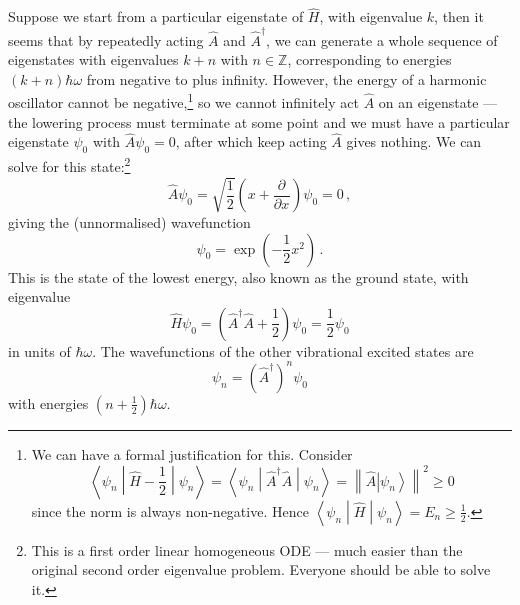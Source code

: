 \documentclass{article}
\theoremstyle{plain}\theoremheaderfont{\normalfont\itshape}\theorembodyfont{\rmfamily}\theoremseparator{.}\newtheorem*{rem}{Remark}\newtheorem*{ex}{Example}\newtheorem*{proof}{Proof}\newtheorem*{altp}{Alternative proof}
\theoremstyle{plain}\theoremheaderfont{\normalfont\bfseries}\theorembodyfont{\rmfamily}\theoremseparator{.}\newtheorem{thm}{Theorem}[section]\newtheorem{lem}[thm]{Lemma}\newtheorem{prop}[thm]{Proposition}\newtheorem*{cor}{Corollary}\newtheorem{defn}[thm]{Definition}\newtheorem{clm}[thm]{Claim}\newtheorem{clminproof}{Claim}\newtheorem*{law}{Law}\newtheorem{pos}[thm]{Postulate}
\theoremstyle{break}\theoremheaderfont{\normalfont\itshape}\theorembodyfont{\rmfamily}\theoremseparator{.\medskip}\newtheorem*{proofskip}{Proof}\newtheorem*{exs}{Examples}\newtheorem*{rems}{Remarks}
\theoremstyle{break}\theoremheaderfont{\normalfont\bfseries}\theorembodyfont{\rmfamily}\theoremseparator{.\medskip}\newtheorem{lemskip}[thm]{Lemma}\newtheorem{defnskip}[thm]{Definition}\newtheorem{propskip}[thm]{Proposition}\newtheorem{thmskip}[thm]{Theorem}
\numberwithin{equation}{section}
\newcommand{\pdv}[3][]{\frac{\partial^{#1} #2}{{\partial #3}^{#1}}}
\newcommand{\ket}[1]{\left| #1 \right\rangle}
\newcommand{\expval}[2]{\left\langle #2 \middle| #1 \middle| #2 \right\rangle}
\newcommand{\norm}[1]{\left\| #1 \right\|}
\begin{document}
    Suppose we start from a particular eigenstate of \(\hat{H}\), with eigenvalue \(k\), then it seems that by repeatedly acting \(\hat{A}\) and \(\hat{A}^\dagger\), we can generate a whole sequence of eigenstates with eigenvalues \(k+n\) with \(n\in\mathbb{Z}\), corresponding to energies \((k+n)\hbar\omega\) from negative to plus infinity. However, the energy of a harmonic oscillator cannot be negative,\footnote{We can have a formal justification for this. Consider
    \begin{equation}
        \expval{\hat{H}-\frac{1}{2}}{\psi_n}=\expval{\hat{A}^\dagger\hat{A}}{\psi_n}=\norm{\hat{A}\ket{\psi_n}}^2\ge 0
    \end{equation}
    since the norm is always non-negative. Hence \(\expval{\hat{H}}{\psi_n}=E_n\ge \frac{1}{2}\).} so we cannot infinitely act \(\hat{A}\) on an eigenstate --- the lowering process must terminate at some point and we must have a particular eigenstate \(\psi_0\) with \(\hat{A}\psi_0=0\), after which keep acting \(\hat{A}\) gives nothing. We can solve for this state:\footnote{This is a first order linear homogeneous ODE --- much easier than the original second order eigenvalue problem. Everyone should be able to solve it.}
    \begin{equation}
        \hat{A}\psi_0=\sqrt{\frac{1}{2}}\left(x+\pdv{}{x}\right)\psi_0=0\,,
    \end{equation}
    giving the (unnormalised) wavefunction
    \begin{equation}
        \psi_0=\exp\left(-\frac{1}{2}x^2\right)\,.
    \end{equation}
    This is the state of the lowest energy, also known as the ground state, with eigenvalue
    \begin{equation}
        \hat{H}\psi_0=\left(\hat{A}^\dagger\hat{A}+\frac{1}{2}\right)\psi_0=\frac{1}{2}\psi_0
    \end{equation}
    in units of \(\hbar\omega\). The wavefunctions of the other vibrational excited states are
    \begin{equation}
        \psi_n=(\hat{A}^\dagger)^n\psi_0
    \end{equation}
    with energies \((n+\frac{1}{2})\hbar\omega\).
\end{document}
